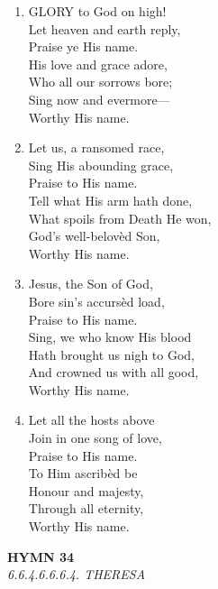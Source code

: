 \documentclass[11pt,a4paper]{article}
\begin{document}
\begin{enumerate}
    \item GLORY to God on high! \\
        Let heaven and earth reply, \\
        Praise ye His name. \\
        His love and grace adore, \\
        Who all our sorrows bore; \\
        Sing now and evermore--- \\
        Worthy His name.

    \item Let us, a ransomed race, \\
        Sing His abounding grace, \\
        Praise to His name. \\
        Tell what His arm hath done, \\
        What spoils from Death He won, \\
        God's well-belov\`ed Son, \\
        Worthy His name.

    \item Jesus, the Son of God, \\
        Bore sin's accurs\`ed load, \\
        Praise to His name. \\
        Sing, we who know His blood \\
        Hath brought us nigh to God, \\
        And crowned us with all good, \\
        Worthy His name.

    \item Let all the hosts above \\
        Join in one song of love, \\
        Praise to His name. \\
        To Him ascrib\`ed be \\
        Honour and majesty, \\
        Through all eternity, \\
        Worthy His name.

\end{enumerate}

\newpage
\begin{center}
    {\Large \textbf{HYMN 34}}
    \\
    \textit{6.6.4.6.6.6.4. THERESA}
\end{center}
\vspace{1em}
\end{document}
